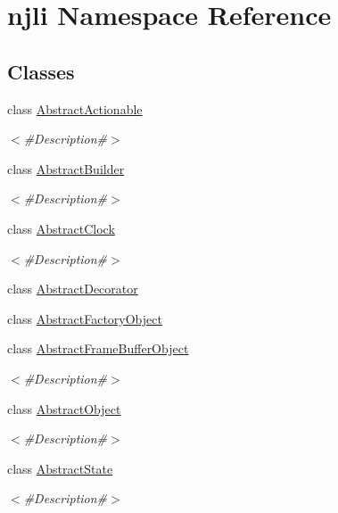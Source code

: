 \hypertarget{namespacenjli}{}\section{njli Namespace Reference}
\label{namespacenjli}
\subsection*{Classes}
\begin{DoxyCompactItemize}
\item 
class \mbox{\hyperlink{classnjli_1_1_abstract_actionable}{Abstract\+Actionable}}
\begin{DoxyCompactList}\small\item\em $<$\#\+Description\#$>$ \end{DoxyCompactList}\item 
class \mbox{\hyperlink{classnjli_1_1_abstract_builder}{Abstract\+Builder}}
\begin{DoxyCompactList}\small\item\em $<$\#\+Description\#$>$ \end{DoxyCompactList}\item 
class \mbox{\hyperlink{classnjli_1_1_abstract_clock}{Abstract\+Clock}}
\begin{DoxyCompactList}\small\item\em $<$\#\+Description\#$>$ \end{DoxyCompactList}\item 
class \mbox{\hyperlink{classnjli_1_1_abstract_decorator}{Abstract\+Decorator}}
\item 
class \mbox{\hyperlink{classnjli_1_1_abstract_factory_object}{Abstract\+Factory\+Object}}
\item 
class \mbox{\hyperlink{classnjli_1_1_abstract_frame_buffer_object}{Abstract\+Frame\+Buffer\+Object}}
\begin{DoxyCompactList}\small\item\em $<$\#\+Description\#$>$ \end{DoxyCompactList}\item 
class \mbox{\hyperlink{classnjli_1_1_abstract_object}{Abstract\+Object}}
\begin{DoxyCompactList}\small\item\em $<$\#\+Description\#$>$ \end{DoxyCompactList}\item 
class \mbox{\hyperlink{classnjli_1_1_abstract_state}{Abstract\+State}}
\begin{DoxyCompactList}\small\item\em $<$\#\+Description\#$>$ \end{DoxyCompactList}\item 

\end{DoxyCompactItemize}

